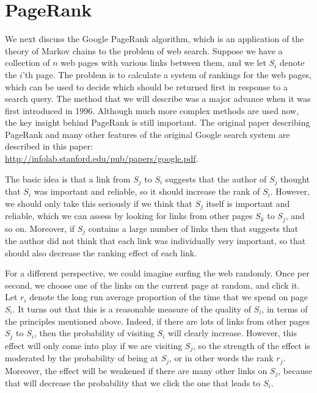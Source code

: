 \documentclass[reqno]{amsart}
\theoremstyle{definition}
\begin{document}
\section{PageRank}

We next discuss the Google PageRank algorithm, which is an application
of the theory of Markov chains to the problem of web search.  Suppose
we have a collection of $n$ web pages with various links between them,
and we let $S_i$ denote the $i$'th page.  The problem is to calculate
a system of rankings for the web pages, which can be used to decide
which should be returned first in response to a search query.  The
method that we will describe was a major advance when it was first
introduced in 1996.  Although much more complex methods are used now,
the key insight behind PageRank is still important.  The original
paper describing PageRank and many other features of the original
Google search system are described in this paper:\\
\url{http://infolab.stanford.edu/pub/papers/google.pdf}.

\medskip

The basic idea is that a link from $S_j$ to $S_i$ suggests that the
author of $S_j$ thought that $S_i$ was important and reliable, so it
should increase the rank of $S_i$.  However, we should only take this
seriously if we think that $S_j$ itself is important and reliable,
which we can assess by looking for links from other pages $S_k$ to
$S_j$, and so on.  Moreover, if $S_j$ contains a large number of links
then that suggests that the author did not think that each link was
individually very important, so that should also decrease the ranking
effect of each link.  

For a different perspective, we could imagine surfing the web
randomly.  Once per second, we choose one of the links on the current
page at random, and click it.  Let $r_i$ denote the long run average
proportion of the time that we spend on page $S_i$.  It turns out that
this is a reasonable measure of the quality of $S_i$, in terms of the
principles mentioned above.  Indeed, if there are lots of links from
other pages $S_j$ to $S_i$, then the probability of visiting $S_i$
will clearly increase.  However, this effect will only come into play
if we are visiting $S_j$, so the strength of the effect is moderated
by the probability of being at $S_j$, or in other words the rank
$r_j$.  Moreover, the effect will be weakened if there are many other
links on $S_j$, because that will decrease the probability that we
click the one that leads to $S_i$.  
\end{document}
